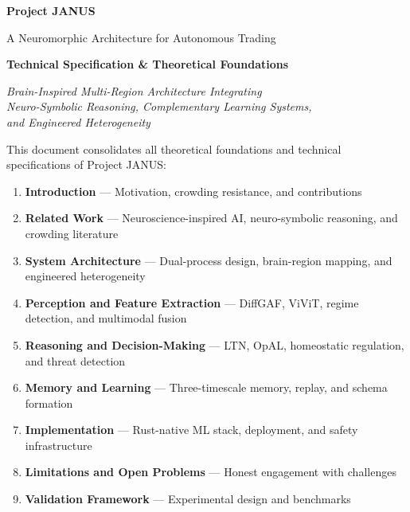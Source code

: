 \documentclass[12pt, a4paper]{article}
\makeatletter
\def\@{}%
\makeatother
\begin{document}
\begin{titlepage}
	\centering
	\vspace*{1cm}

	{\Huge\bfseries\color{janusblue} Project JANUS\par}
	\vspace{0.3cm}
	{\Large\color{accentgold} A Neuromorphic Architecture for Autonomous Trading\par}
	\vspace{1cm}

	{\LARGE\bfseries Technical Specification \& Theoretical Foundations\par}
	\vspace{0.5cm}

	{\large\itshape Brain-Inspired Multi-Region Architecture Integrating\\Neuro-Symbolic Reasoning, Complementary Learning Systems,\\and Engineered Heterogeneity\/\par}
	\vspace{1cm}

	\begin{tcolorbox}[colback=janusblue!5, colframe=janusblue, title=\textbf{Unified Documentation}, width=0.85\textwidth]
		\singlespacing\small
		This document consolidates all theoretical foundations and technical specifications of Project JANUS\@:
		\begin{enumerate}[leftmargin=1.5cm, itemsep=1pt, parsep=1pt, topsep=2pt]
			\item \textbf{\textcolor{janusblue}{Introduction}} — Motivation, crowding resistance, and contributions
			\item \textbf{\textcolor{janusblue}{Related Work}} — Neuroscience-inspired AI, neuro-symbolic reasoning, and crowding literature
			\item \textbf{\textcolor{forwardblue}{System Architecture}} — Dual-process design, brain-region mapping, and engineered heterogeneity
			\item \textbf{\textcolor{forwardblue}{Perception and Feature Extraction}} — DiffGAF, ViViT, regime detection, and multimodal fusion
			\item \textbf{\textcolor{backwardpurple}{Reasoning and Decision-Making}} — LTN, OpAL, homeostatic regulation, and threat detection
			\item \textbf{\textcolor{backwardpurple}{Memory and Learning}} — Three-timescale memory, replay, and schema formation
			\item \textbf{\textcolor{rustorange}{Implementation}} — Rust-native ML stack, deployment, and safety infrastructure
			\item \textbf{\textcolor{warnred}{Limitations and Open Problems}} — Honest engagement with challenges
			\item \textbf{\textcolor{janusblue}{Validation Framework}} — Experimental design and benchmarks
		\end{enumerate}%
	\end{tcolorbox}


\end{titlepage}
\end{document}
